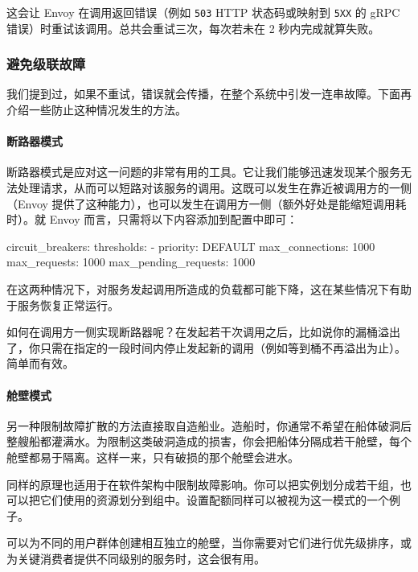 \label{idx:347}
这会让 Envoy 在调用返回错误（例如 \texttt{503} HTTP 状态码或映射到 \texttt{5XX} 的 gRPC 错误）时重试该调用。总共会重试三次，每次若未在 2 秒内完成就算失败。

\subsubsection{避免级联故障}

我们提到过，如果不重试，错误就会传播，在整个系统中引发一连串故障。下面再介绍一些防止这种情况发生的方法。

\paragraph{断路器模式}

\label{idx:348}
\label{idx:349}
断路器模式是应对这一问题的非常有用的工具。它让我们能够迅速发现某个服务无法处理请求，从而可以短路对该服务的调用。这既可以发生在靠近被调用方的一侧（Envoy 提供了这种能力），也可以发生在调用方一侧（额外好处是能缩短调用耗时）。就 Envoy 而言，只需将以下内容添加到配置中即可：

\begin{codebox}[yaml]
circuit_breakers:
  thresholds:
    - priority: DEFAULT
      max_connections: 1000
      max_requests: 1000
      max_pending_requests: 1000
\end{codebox}

在这两种情况下，对服务发起调用所造成的负载都可能下降，这在某些情况下有助于服务恢复正常运行。

如何在调用方一侧实现断路器呢？在发起若干次调用之后，比如说你的漏桶溢出了，你只需在指定的一段时间内停止发起新的调用（例如等到桶不再溢出为止）。简单而有效。

\paragraph{舱壁模式}

\label{idx:350}
另一种限制故障扩散的方法直接取自造船业。造船时，你通常不希望在船体破洞后整艘船都灌满水。为限制这类破洞造成的损害，你会把船体分隔成若干舱壁，每个舱壁都易于隔离。这样一来，只有破损的那个舱壁会进水。

\label{idx:351}
同样的原理也适用于在软件架构中限制故障影响。你可以把实例划分成若干组，也可以把它们使用的资源划分到组中。设置配额同样可以被视为这一模式的一个例子。

可以为不同的用户群体创建相互独立的舱壁，当你需要对它们进行优先级排序，或为关键消费者提供不同级别的服务时，这会很有用。

